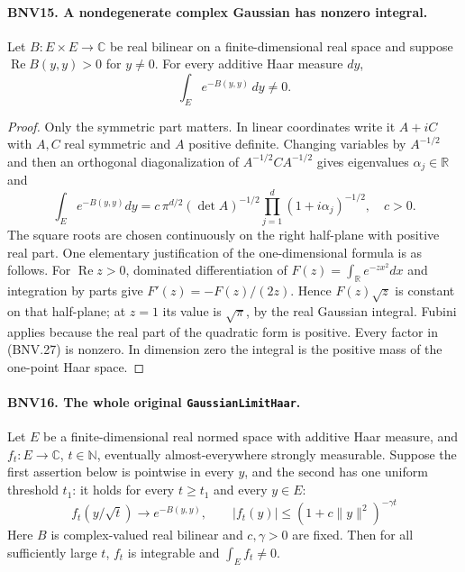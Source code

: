 \paragraph{BNV15. A nondegenerate complex Gaussian has nonzero integral.}
\label{claim:BNV15}
Let $B:E\times E\to\mathbb C$ be real bilinear on a finite-dimensional
real space and suppose $\operatorname{Re}B(y,y)>0$ for $y\ne0$.
For every additive Haar measure $dy$,
\[
 \int_E e^{-B(y,y)}\,dy\ne0.
 \tag{BNV.26}
\]

\begin{proof}
Only the symmetric part matters.  In linear coordinates write it
$A+iC$ with $A,C$ real symmetric and $A$ positive definite.
Changing variables by $A^{-1/2}$ and then an orthogonal diagonalization
of $A^{-1/2}CA^{-1/2}$ gives eigenvalues $\alpha_j\in\mathbb R$ and
\[
 \int_E e^{-B(y,y)}dy
   =c\,\pi^{d/2}(\det A)^{-1/2}
           \prod_{j=1}^{d}(1+i\alpha_j)^{-1/2},\quad c>0.
 \tag{BNV.27}
\]
The square roots are chosen continuously on the right half-plane with
positive real part.  One elementary justification of the one-dimensional
formula is as follows.  For $\operatorname{Re}z>0$, dominated
differentiation of $F(z)=\int_{\mathbb R}e^{-zx^2}dx$ and integration
by parts give $F'(z)=-F(z)/(2z)$.  Hence $F(z)\sqrt z$ is constant
on that half-plane; at $z=1$ its value is $\sqrt\pi$, by the real
Gaussian integral.  Fubini applies because the real part of the quadratic
form is positive.  Every factor in (BNV.27) is nonzero.  In dimension
zero the integral is the positive mass of the one-point Haar space.
\end{proof}

\paragraph{BNV16. The whole original \texttt{GaussianLimitHaar}.}
\label{claim:BNV16}
Let $E$ be a finite-dimensional real normed space with additive Haar
measure, and $f_t:E\to\mathbb C$, $t\in\mathbb N$, eventually
almost-everywhere strongly measurable.
Suppose the first assertion below is pointwise in every $y$, and the
second has one uniform threshold $t_1$: it holds for every $t\ge t_1$
and every $y\in E$:
\[
 f_t(y/\sqrt t)\longrightarrow e^{-B(y,y)},
 \qquad |f_t(y)|\le(1+c\|y\|^2)^{-\gamma t}
 \tag{BNV.28}
\]
Here $B$ is complex-valued real bilinear and $c,\gamma>0$ are fixed.
Then for all sufficiently large $t$, $f_t$ is integrable and
$\int_E f_t\ne0$.

